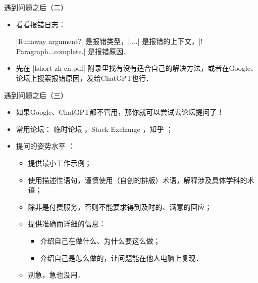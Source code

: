 \begin{frame}[fragile]{遇到问题之后（二）}
	\begin{itemize}
		\item<+-> 看看报错日志：
		      
		      |Runaway argument?| 是报错类型，|\BIBentryALTinterwordspacing...\ETC.| 是报错的上下文，|! Paragraph...complete.| 是报错原因．
		\item<+-> 先在 |lshort-zh-cn.pdf| 附录里找有没有适合自己的解决方法，或者在Google、论坛上搜索报错原因，发给ChatGPT也行．
	\end{itemize}
\end{frame}

\begin{frame}[fragile]{遇到问题之后（三）}
	\begin{itemize}
		\item<+-> 如果Google、ChatGPT都不管用，那你就可以尝试去论坛提问了！
		\item<+-> 常用论坛： \CTeX{}临时论坛 ，Stack Exchange ，知乎 ；
		\item<+-> 提问的姿势水平 ：
		      \begin{itemize}
			      \item 提供最小工作示例；
			      \item 使用描述性语句，谨慎使用（自创的排版）术语，解释涉及具体学科的术语；
			      \item 除非是付费服务，否则不能要求得到及时的、满意的回应；
			      \item 提供准确而详细的信息：
			            \begin{itemize}
				            \item 介绍自己在做什么、为什么要这么做；
				            \item 介绍自己是怎么做的，让问题能在他人电脑上复现．
			            \end{itemize}
			      \item \alert{别急}，急也没用．
		      \end{itemize}
	\end{itemize}
\end{frame}

